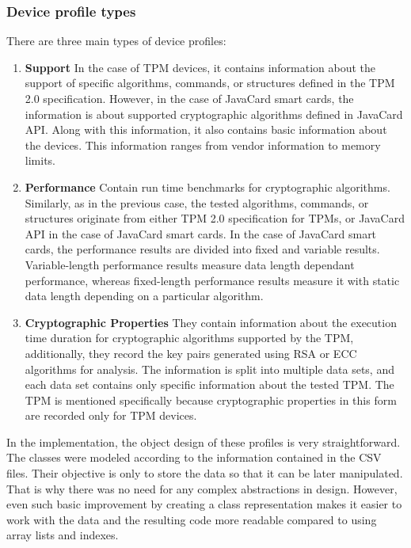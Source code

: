 \subsubsection{Device profile types}\label{sec:device-profiles}
There are three main types of device profiles:
\begin{enumerate}
    \item \textbf{Support} In the case of TPM devices, it contains information about the support of specific algorithms, commands, or structures defined in the TPM 2.0 specification. However, in the case of JavaCard smart cards, the information is about supported cryptographic algorithms defined in JavaCard API. Along with this information, it also contains basic information about the devices. This information ranges from vendor information to memory limits.
    
    \item \textbf{Performance} Contain run time benchmarks for cryptographic algorithms. Similarly, as in the previous case, the tested algorithms, commands, or structures originate from either TPM 2.0 specification for TPMs, or JavaCard API in the case of JavaCard smart cards. In the case of JavaCard smart cards, the performance results are divided into fixed and variable results. Variable-length performance results measure data length dependant performance, whereas fixed-length performance results measure it with static data length depending on a particular algorithm.
    
    \item \textbf{Cryptographic Properties} They contain information about the execution time duration for cryptographic algorithms supported by the TPM, additionally, they record the key pairs generated using RSA or ECC algorithms for analysis. The information is split into multiple data sets, and each data set contains only specific information about the tested TPM. The TPM is mentioned specifically because cryptographic properties in this form are recorded only for TPM devices.
\end{enumerate}

In the implementation, the object design of these profiles is very straightforward. The classes were modeled according to the information contained in the CSV files. Their objective is only to store the data so that it can be later manipulated. That is why there was no need for any complex abstractions in design. However, even such basic improvement by creating a class representation makes it easier to work with the data and the resulting code more readable compared to using array lists and indexes.

